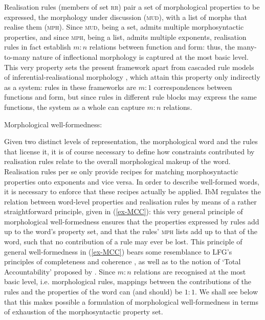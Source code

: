 \documentclass[output=paper
	        ,collection
	        ,collectionchapter
 	        ,biblatex
                ,babelshorthands
                ,newtxmath
                ,draftmode
                ,colorlinks, citecolor=brown
]{langscibook}
\begin{document}
\begin{exe}
\begin{xlist}
\begin{exe}
\end{exe}

Realisation rules (members of set \textsc{rr}) pair a set of
morphological properties to be expressed, the morphology under
discussion (\textsc{mud}), with a list of morphs that realise them
(\textsc{mph}). Since \textsc{mud}, being a set, admits multiple
morphosyntactic properties, and since \textsc{mph}, being a list,
admits multiple exponents, realisation rules in fact establish $m:n$
relations between function and form: thus, the many-to-many nature of
inflectional morphology is captured at the most basic level. This very
property sets the present framework apart from cascaded rule models of
inferential-realisational morphology \citep{Anderson92,Stump01}, which
attain this property only indirectly as a system: rules in these
frameworks are $m:1$ correspondences between functions and form, but
since rules in different rule blocks may express the same functions,
the system as a whole can capture $m:n$ relations.

\ea
\label{ex-MCC}
Morphological well-formedness:\\
\z

Given two distinct levels of representation, the morphological word
and the rules that license it, it is of course necessary to define how
constraints contributed by realisation rules relate to the overall
morphological makeup of the word. Realisation rules per se only
provide recipes for matching morphosyntactic properties onto exponents
and vice versa. In order to describe well-formed words, it is
necessary to enforce that these recipes actually be applied. IbM
regulates the relation between word-level properties and realisation
rules by means of a rather straightforward principle, given in
(\ref{ex-MCC}): this very general principle of morphological
well-formedness ensures that the properties expressed by rules add up
to the word's property set, and that the rules' \textsc{mph} lists add
up to that of the word, such that no contribution of a rule may ever
be lost. This principle of general well-formedness in
(\ref{ex-MCC}) bears some resemblance to LFG's principles of
completeness and coherence \citep{bresnan_j82}, as well as to the
notion of `Total Accountability' proposed by \citet{Hockett47}. Since
$m:n$ relations are recognised at the most basic level,
i.e. morphological rules, mappings between the contributions of the
rules and the properties of the word can (and should) be $1:1$.  We
shall see below that this makes possible a formulation of morphological
well-formedness in terms of exhaustion of the morphosyntactic property
set.


\end{xlist}
\end{exe}
\end{document}
